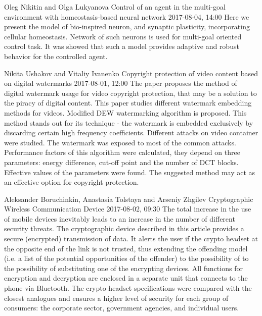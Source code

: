 \documentclass[10pt,fleqn,openany]{book} %
\begin{document}
\begin{enumerate}
		
		\paperabstract
		{Oleg Nikitin and Olga Lukyanova}
		{Control of an agent in the multi-goal environment with homeostasis-based neural network}
		{2017-08-04, 14:00}
		{Here we present the model of bio-inspired neuron, and synaptic plasticity, incorporating cellular homeostasis. Network of such neurons is used for multi-goal oriented control task. It was showed that such a model provides adaptive and robust behavior for the controlled agent.}
		
		
		\paperabstract
		{Nikita Ushakov and Vitaliy Ivanenko}
		{Copyright protection of video content based on digital watermarks}
		{2017-08-01, 12:00}
		{The paper proposes the method of digital watermark usage for video copyright protection, that may be a solution to the piracy of digital content. This paper studies different watermark embedding methods for videos. Modified DEW watermarking algorithm is proposed. This method stands out for its technique - the watermark is embedded exclusively by discarding certain high frequency coefficients. Different attacks on video container were studied. The watermark was exposed to most of the common attacks. Performance factors of this algorithm were calculated, they depend on three parameters: energy difference, cut-off point and the number of DCT blocks. Effective values of the parameters were found. The suggested method may act as an effective option for copyright protection.}
		
		
		\paperabstract
		{Aleksander Boruchinkin, Anastasia Tolstaya and Arseniy Zhgilev}
		{Cryptographic Wireless Communication Device}
		{2017-08-02, 09:30}
		{The total increase in the use of mobile devices inevitably leads to an increase in the number of different security threats. The cryptographic device described in this article provides a secure (encrypted) transmission of data. It alerts the user if the crypto headset at the opposite end of the link is not trusted, thus extending the offending model (i.e. a list of the potential opportunities of the offender) to the possibility of to the possibility of substituting one of the encrypting devices. All functions for encryption and decryption are enclosed in a separate unit that connects to the phone via Bluetooth. The crypto headset specifications were compared with the closest analogues and ensures a higher level of security for each group of consumers: the corporate sector, government agencies, and individual users.}
		

\end{enumerate}
\end{document}
